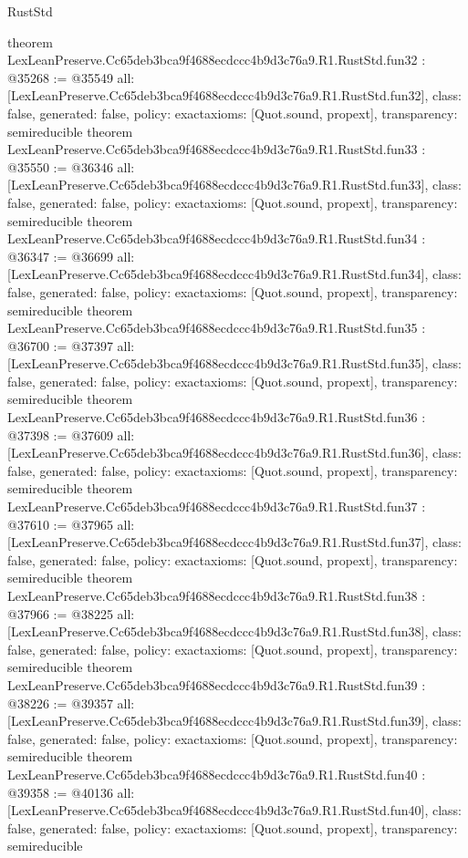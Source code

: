 \begin{lexlean}{RustStd}
\begin{coremodule}
{}
theorem LexLeanPreserve.Cc65deb3bca9f4688ecdccc4b9d3c76a9.R1.RustStd.fun32 : @35268 := @35549 {
  all: [LexLeanPreserve.Cc65deb3bca9f4688ecdccc4b9d3c76a9.R1.RustStd.fun32],
  class: false,
  generated: false,
  policy: exact{axioms: [Quot.sound, propext]},
  transparency: semireducible
}
theorem LexLeanPreserve.Cc65deb3bca9f4688ecdccc4b9d3c76a9.R1.RustStd.fun33 : @35550 := @36346 {
  all: [LexLeanPreserve.Cc65deb3bca9f4688ecdccc4b9d3c76a9.R1.RustStd.fun33],
  class: false,
  generated: false,
  policy: exact{axioms: [Quot.sound, propext]},
  transparency: semireducible
}
theorem LexLeanPreserve.Cc65deb3bca9f4688ecdccc4b9d3c76a9.R1.RustStd.fun34 : @36347 := @36699 {
  all: [LexLeanPreserve.Cc65deb3bca9f4688ecdccc4b9d3c76a9.R1.RustStd.fun34],
  class: false,
  generated: false,
  policy: exact{axioms: [Quot.sound, propext]},
  transparency: semireducible
}
theorem LexLeanPreserve.Cc65deb3bca9f4688ecdccc4b9d3c76a9.R1.RustStd.fun35 : @36700 := @37397 {
  all: [LexLeanPreserve.Cc65deb3bca9f4688ecdccc4b9d3c76a9.R1.RustStd.fun35],
  class: false,
  generated: false,
  policy: exact{axioms: [Quot.sound, propext]},
  transparency: semireducible
}
theorem LexLeanPreserve.Cc65deb3bca9f4688ecdccc4b9d3c76a9.R1.RustStd.fun36 : @37398 := @37609 {
  all: [LexLeanPreserve.Cc65deb3bca9f4688ecdccc4b9d3c76a9.R1.RustStd.fun36],
  class: false,
  generated: false,
  policy: exact{axioms: [Quot.sound, propext]},
  transparency: semireducible
}
theorem LexLeanPreserve.Cc65deb3bca9f4688ecdccc4b9d3c76a9.R1.RustStd.fun37 : @37610 := @37965 {
  all: [LexLeanPreserve.Cc65deb3bca9f4688ecdccc4b9d3c76a9.R1.RustStd.fun37],
  class: false,
  generated: false,
  policy: exact{axioms: [Quot.sound, propext]},
  transparency: semireducible
}
theorem LexLeanPreserve.Cc65deb3bca9f4688ecdccc4b9d3c76a9.R1.RustStd.fun38 : @37966 := @38225 {
  all: [LexLeanPreserve.Cc65deb3bca9f4688ecdccc4b9d3c76a9.R1.RustStd.fun38],
  class: false,
  generated: false,
  policy: exact{axioms: [Quot.sound, propext]},
  transparency: semireducible
}
theorem LexLeanPreserve.Cc65deb3bca9f4688ecdccc4b9d3c76a9.R1.RustStd.fun39 : @38226 := @39357 {
  all: [LexLeanPreserve.Cc65deb3bca9f4688ecdccc4b9d3c76a9.R1.RustStd.fun39],
  class: false,
  generated: false,
  policy: exact{axioms: [Quot.sound, propext]},
  transparency: semireducible
}
theorem LexLeanPreserve.Cc65deb3bca9f4688ecdccc4b9d3c76a9.R1.RustStd.fun40 : @39358 := @40136 {
  all: [LexLeanPreserve.Cc65deb3bca9f4688ecdccc4b9d3c76a9.R1.RustStd.fun40],
  class: false,
  generated: false,
  policy: exact{axioms: [Quot.sound, propext]},
  transparency: semireducible
}
\end{coremodule}
\end{lexlean}
